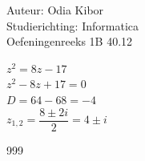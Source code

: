 \documentclass[a4paper]{article}
\begin{document}
  
\noindent \large Auteur: Odia Kibor \\
\noindent \large Studierichting: Informatica\\
\noindent \large Oefeningenreeks 1B 40.12 \\

\medskip

\normalsize

$z^2 = 8z - 17$\\

$z^2 - 8z + 17 = 0$\\

$D = 64 - 68 = -4$\\

$z_{1,2} = \dfrac{8\pm2i}{2} = 4\pm i$\\


\begin{thebibliography}{999}
\end{thebibliography}
\end{document}
